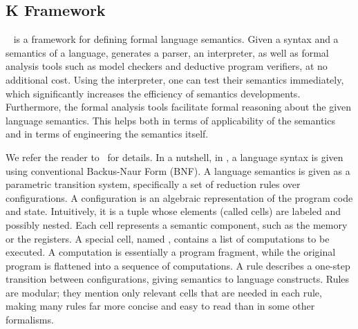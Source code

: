 \subsection{K Framework}\label{sec:KF}

\K~\cite{k-primer-2013-v32}  is a framework for
defining formal language semantics. Given a syntax and a semantics of a language, \K
generates a parser, an interpreter, as well as formal analysis tools such as
model checkers and deductive program verifiers, at no additional cost. Using
the interpreter, one can test their semantics immediately, which significantly
increases the efficiency of semantics developments. Furthermore, the formal
analysis tools facilitate formal reasoning about the given language semantics.
This helps both in terms of applicability of the semantics and in terms of
engineering the semantics itself.

We   refer the reader to~\cite{k-primer-2013-v32, rosu-serbanuta-2010-jlap} for
 details. In a nutshell, in \K, a language syntax is given using conventional
Backus-Naur Form (BNF). A language semantics is given as a parametric
transition system, specifically a set of reduction rules over configurations. A configuration is an algebraic representation of the
program code and state. Intuitively, it is a tuple whose elements
(called cells) are labeled and possibly nested. Each cell represents a
semantic component, such as the memory or the registers. A special cell, named , contains a
list of computations to be executed. A computation is essentially
a program fragment, while the original program is flattened into a
sequence of computations. A rule describes a one-step transition
between configurations, giving semantics to language
constructs. Rules are modular; they mention only relevant cells that
are needed in each rule, making many rules far more concise and easy to read
than in some other formalisms.




% 
